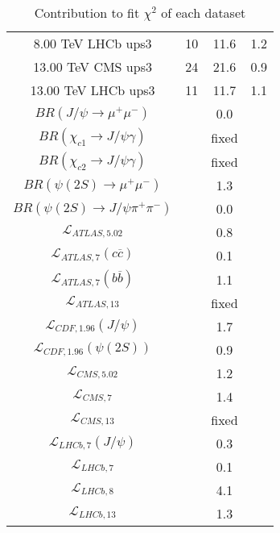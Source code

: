 \begin{table}[h!]
\begin{tabular}{c|c|c|c}
8.00 TeV LHCb ups3 & 10 & 11.6 & 1.2 \\
13.00 TeV CMS ups3 & 24 & 21.6 & 0.9 \\
13.00 TeV LHCb ups3 & 11 & 11.7 & 1.1 \\
\hline
$BR(J/\psi\rightarrow\mu^+\mu^-)$ &  & 0.0 &  \\
$BR(\chi_{c1}\rightarrow J/\psi\gamma)$ &  & fixed & \\
$BR(\chi_{c2}\rightarrow J/\psi\gamma)$ &  & fixed & \\
$BR(\psi(2S)\rightarrow\mu^+\mu^-)$ &  & 1.3 &  \\
$BR(\psi(2S)\rightarrow J/\psi\pi^+\pi^-)$ &  & 0.0 &  \\
$\mathcal L_{ATLAS,5.02}$ &  & 0.8 &  \\
$\mathcal L_{ATLAS,7}(c\overline c)$ &  & 0.1 &  \\
$\mathcal L_{ATLAS,7}(b\overline b)$ &  & 1.1 &  \\
$\mathcal L_{ATLAS,13}$ &  & fixed & \\
$\mathcal L_{CDF,1.96}(J/\psi)$ &  & 1.7 &  \\
$\mathcal L_{CDF,1.96}(\psi(2S))$ &  & 0.9 &  \\
$\mathcal L_{CMS,5.02}$ &  & 1.2 &  \\
$\mathcal L_{CMS,7}$ &  & 1.4 &  \\
$\mathcal L_{CMS,13}$ &  & fixed & \\
$\mathcal L_{LHCb,7}(J/\psi)$ &  & 0.3 &  \\
$\mathcal L_{LHCb,7}$ &  & 0.1 &  \\
$\mathcal L_{LHCb,8}$ &  & 4.1 &  \\
$\mathcal L_{LHCb,13}$ &  & 1.3 &  \\
\end{tabular}
\caption{Contribution to fit $\chi^2$ of each dataset}
\end{table}
